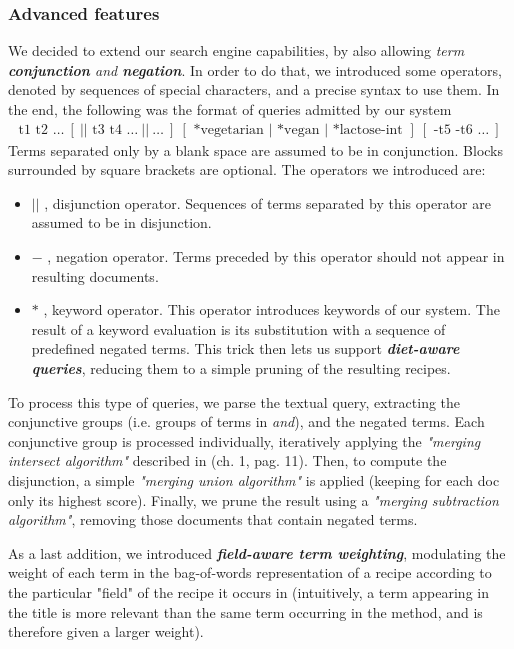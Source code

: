 \subsubsection{Advanced features}

We decided to extend our search engine capabilities, by also allowing \textit{term \textbf{conjunction} and \textbf{negation}}. In order to do that, we introduced some operators, denoted by sequences of special characters, and a precise syntax to use them. In the end, the following was the format of queries admitted by our system
\begin{align*}
	\text{t1 t2 }\ldots \ [ \ || \text{ t3 t4 } \ldots \ || \ \ldots \ ] \ [ \text{ *vegetarian } | \text{ *vegan } | \text{ *lactose-int }] \ [ \text{ -t5 -t6 }\ldots \ ]
\end{align*}
Terms separated only by a blank space are assumed to be in conjunction. Blocks surrounded by square brackets are optional. The operators we introduced are:
\begin{itemize}
	\item $||$ , disjunction operator. Sequences of terms separated by this operator are assumed to be in disjunction.
	
	\item $-$ , negation operator. Terms preceded by this operator should not appear in resulting documents.
	
	\item $*$ , keyword operator. This operator introduces keywords of our system. The result of a keyword evaluation is its substitution with a sequence of predefined negated terms. This trick then lets us support \textit{\textbf{diet-aware queries}}, reducing them to a simple pruning of the resulting recipes.
\end{itemize}
To process this type of queries, we parse the textual query, extracting the conjunctive groups (i.e. groups of terms in \textit{and}), and the negated terms. Each conjunctive group is processed individually, iteratively applying the \textit{"merging intersect algorithm"} described in \cite{iir} (ch. 1, pag. 11). Then, to compute the disjunction, a simple \textit{"merging union algorithm"} is applied (keeping for each doc only its highest score). Finally, we prune the result using a \textit{"merging subtraction algorithm"}, removing those documents that contain negated terms.

\medskip

\noindent As a last addition, we introduced \textit{\textbf{field-aware term weighting}}, modulating the weight of each term in the bag-of-words representation of a recipe according to the particular "field" of the recipe it occurs in (intuitively, a term appearing in the title is more relevant than the same term occurring in the method, and is therefore given a larger weight).


